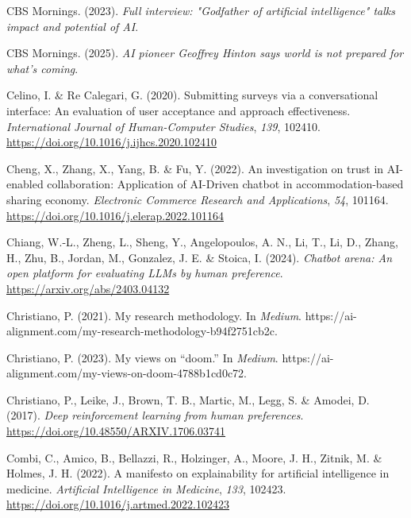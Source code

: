 \documentclass[
  letterpaper,
  DIV=11,
  numbers=noendperiod]{scrartcl}
\newlength{\cslhangindent}
\newenvironment{CSLReferences}[2] %
 {\begin{list}{}{%
  \setlength{\itemindent}{0pt}
  \setlength{\leftmargin}{0pt}
  \setlength{\parsep}{0pt}
  \ifodd #1
   \setlength{\leftmargin}{\cslhangindent}
   \setlength{\itemindent}{-1\cslhangindent}
  \fi
  \setlength{\itemsep}{#2\baselineskip}}}
 {\end{list}}
\begin{document}
\begin{CSLReferences}{1}{0}
CBS Mornings. (2023). \emph{Full interview: "{Godfather} of artificial
intelligence" talks impact and potential of {AI}}.

CBS Mornings. (2025). \emph{{AI} pioneer {Geoffrey Hinton} says world is
not prepared for what's coming}.

Celino, I. \& Re Calegari, G. (2020). Submitting surveys via a
conversational interface: {An} evaluation of user acceptance and
approach effectiveness. \emph{International Journal of Human-Computer
Studies}, \emph{139}, 102410.
\url{https://doi.org/10.1016/j.ijhcs.2020.102410}

Cheng, X., Zhang, X., Yang, B. \& Fu, Y. (2022). An investigation on
trust in {AI-enabled} collaboration: {Application} of {AI-Driven}
chatbot in accommodation-based sharing economy. \emph{Electronic
Commerce Research and Applications}, \emph{54}, 101164.
\url{https://doi.org/10.1016/j.elerap.2022.101164}

Chiang, W.-L., Zheng, L., Sheng, Y., Angelopoulos, A. N., Li, T., Li,
D., Zhang, H., Zhu, B., Jordan, M., Gonzalez, J. E. \& Stoica, I.
(2024). \emph{Chatbot arena: {An} open platform for evaluating {LLMs} by
human preference}. \url{https://arxiv.org/abs/2403.04132}

Christiano, P. (2021). My research methodology. In \emph{Medium}.
https://ai-alignment.com/my-research-methodology-b94f2751cb2c.

Christiano, P. (2023). My views on {``doom.''} In \emph{Medium}.
https://ai-alignment.com/my-views-on-doom-4788b1cd0c72.

Christiano, P., Leike, J., Brown, T. B., Martic, M., Legg, S. \& Amodei,
D. (2017). \emph{Deep reinforcement learning from human preferences}.
\url{https://doi.org/10.48550/ARXIV.1706.03741}

Combi, C., Amico, B., Bellazzi, R., Holzinger, A., Moore, J. H., Zitnik,
M. \& Holmes, J. H. (2022). A manifesto on explainability for artificial
intelligence in medicine. \emph{Artificial Intelligence in Medicine},
\emph{133}, 102423. \url{https://doi.org/10.1016/j.artmed.2022.102423}


\end{CSLReferences}
\end{document}
